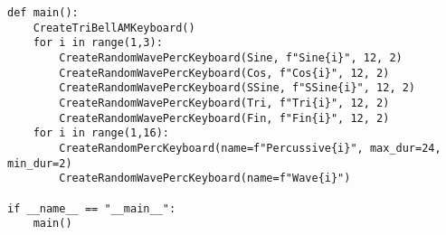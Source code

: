 \documentclass[../main.tex]{subfiles}
\begin{document}
\begin{verbatim}
def main():
    CreateTriBellAMKeyboard()
    for i in range(1,3):
        CreateRandomWavePercKeyboard(Sine, f"Sine{i}", 12, 2)
        CreateRandomWavePercKeyboard(Cos, f"Cos{i}", 12, 2)
        CreateRandomWavePercKeyboard(SSine, f"SSine{i}", 12, 2)
        CreateRandomWavePercKeyboard(Tri, f"Tri{i}", 12, 2)
        CreateRandomWavePercKeyboard(Fin, f"Fin{i}", 12, 2)
    for i in range(1,16):
        CreateRandomPercKeyboard(name=f"Percussive{i}", max_dur=24, min_dur=2)
        CreateRandomWavePercKeyboard(name=f"Wave{i}")

if __name__ == "__main__":
    main()
\end{verbatim}
\end{document}
